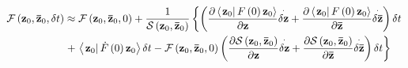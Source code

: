 \documentclass[aps,preprint]{revtex4}
\begin{document}
\begin{align}
\mathcal{F}\left( \mathbf{z}_{0},\mathbf{\bar{z}}_{0},\delta t\right) &
\approx \mathcal{F}\left( \mathbf{z}_{0},\mathbf{\bar{z}}_{0},0\right) +%
\frac{1}{\mathcal{S}\left( \mathbf{z}_{0},\mathbf{\bar{z}}_{0}\right) }%
\left\{ \left( \frac{\partial \left\langle \left. \mathbf{z}_{0}\right\vert
F\left( 0\right) \mathbf{z}_{0}\right\rangle }{\partial \mathbf{z}}\overset{%
\cdot }{\delta \mathbf{z}}+\frac{\partial \left\langle \left. \mathbf{z}%
_{0}\right\vert F\left( 0\right) \mathbf{z}_{0}\right\rangle }{\partial 
\mathbf{\bar{z}}}\overset{\cdot }{\delta \mathbf{\bar{z}}}\right) \delta
t\right.  \notag \\
& \left. +\,\left\langle \left. \mathbf{z}_{0}\right\vert \dot{F}\left(
0\right) \mathbf{z}_{0}\right\rangle \delta t-\mathcal{F}\left( \mathbf{z}%
_{0},\mathbf{\bar{z}}_{0},0\right) \left( \frac{\partial \mathcal{S}\left( 
\mathbf{z}_{0},\mathbf{\bar{z}}_{0}\right) }{\partial \mathbf{z}}\overset{%
\cdot }{\delta \mathbf{z}}+\frac{\partial \mathcal{S}\left( \mathbf{z}_{0},%
\mathbf{\bar{z}}_{0}\right) }{\partial \mathbf{\bar{z}}}\overset{\cdot }{%
\delta \mathbf{\bar{z}}}\right) \delta t\right\}
\end{align}
\end{document}
